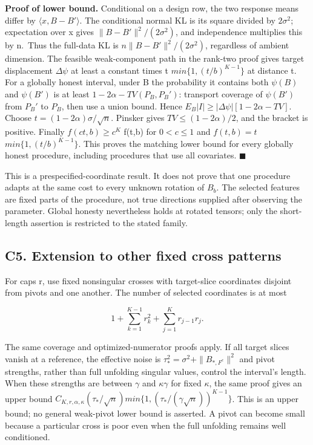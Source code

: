 \documentclass[
  11pt,
]{article}
\begin{document}
\textbf{Proof of lower bound.} Conditional on a design row, the two
response means differ by \(\langle x,B-B'\rangle\). The conditional
normal KL is its square divided by \(2\sigma ^{2}\); expectation over x
gives \(\|B-B'\|^{2}/(2\sigma ^{2})\), and independence multiplies this
by n.~Thus the full-data KL is \(n\|B-B'\|^{2}/(2\sigma ^{2})\),
regardless of ambient dimension. The feasible weak-component path in the
rank-two proof gives target displacement \(\Delta \psi\) at least a
constant times t \(min\{1,(t/b)^{K-1}\}\) at distance t. For a globally
honest interval, under B the probability it contains both \(\psi (B)\)
and \(\psi (B')\) is at least \(1-2\alpha -TV(P_B,P_B')\): transport
coverage of \(\psi (B')\) from \(P_B'\) to \(P_B\), then use a union
bound. Hence \(E_B|I|\ge |\Delta \psi |[1-2\alpha -TV]\). Choose
\(t=(1-2\alpha )\sigma /\sqrt{n}\). Pinsker gives
\(TV\le (1-2\alpha )/2\), and the bracket is positive. Finally
\(f(ct,b)\ge c^K\) f(t,b) for \(0<c\le 1\) and \(f(t,b)=t\)
\(min\{1,(t/b)^{K-1}\}\). This proves the matching lower bound for every
globally honest procedure, including procedures that use all covariates.
\(\blacksquare\)

This is a prespecified-coordinate result. It does not prove that one
procedure adapts at the same cost to every unknown rotation of \(B_b\).
The selected features are fixed parts of the procedure, not true
directions supplied after observing the parameter. Global honesty
nevertheless holds at rotated tensors; only the short-length assertion
is restricted to the stated family.

\subsection{C5. Extension to other fixed cross
patterns}\label{c5.-extension-to-other-fixed-cross-patterns}

For caps r, use fixed nonsingular crosses with target-slice coordinates
disjoint from pivots and one another. The number of selected coordinates
is at most

\[
 1+\sum_{k=1}^{K-1}r_k^2+\sum_{j=1}^K r_{j-1}r_j.
\]

The same coverage and optimized-numerator proofs apply. If all target
slices vanish at a reference, the effective noise is
\(\tau _*^{2}=\sigma ^{2}+\|B_{*,F^c}\|^{2}\) and pivot strengths,
rather than full unfolding singular values, control the interval's
length. When these strengths are between \(\gamma\) and
\(\kappa \gamma\) for fixed \(\kappa\), the same proof gives an upper
bound
\(C_{K,r,\alpha ,\kappa }(\tau _*/\sqrt{n})min\{1,(\tau _*/(\gamma \sqrt{n}))^{K-1}\}\).
This is an upper bound; no general weak-pivot lower bound is asserted. A
pivot can become small because a particular cross is poor even when the
full unfolding remains well conditioned.
\end{document}
